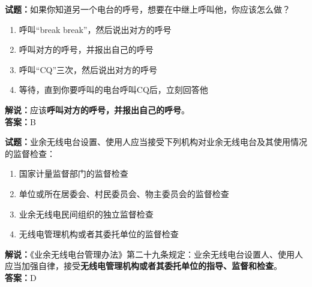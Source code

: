 \documentclass{ctexbook}
\begin{document}
\vspace{1em}

\textbf{试题：}如果你知道另一个电台的呼号，想要在中继上呼叫他，你应该怎么做？
\begin{enumerate}[leftmargin=3em]
  \item 呼叫“break break”，然后说出对方的呼号
  \item 呼叫对方的呼号，并报出自己的呼号
  \item 呼叫“CQ”三次，然后说出对方的呼号
  \item 等待，直到你要呼叫的电台呼叫CQ后，立刻回答他
\end{enumerate}
\noindent\textbf{解说：}应该\textbf{呼叫对方的呼号，并报出自己的呼号}。\\\noindent\textbf{答案：}B

\vspace{1em}

\textbf{试题：}业余无线电台设置、使用人应当接受下列机构对业余无线电台及其使用情况的监督检查：
\begin{enumerate}[leftmargin=3em]
  \item 国家计量监督部门的监督检查
  \item 单位或所在居委会、村民委员会、物主委员会的监督检查
  \item 业余无线电民间组织的独立监督检查
  \item 无线电管理机构或者其委托单位的监督检查
\end{enumerate}
\noindent\textbf{解说：}《业余无线电台管理办法》第二十九条规定：业余无线电台设置人、使用人应当加强自律，接受\textbf{无线电管理机构或者其委托单位的指导、监督和检查}。\\\noindent\textbf{答案：}D

\vspace{1em}
\end{document}
